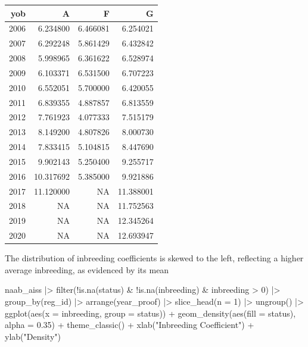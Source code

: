 \documentclass[
]{article}
\newenvironment{Shaded}{\begin{snugshade}}{\end{snugshade}}
\newcommand{\AttributeTok}[1]{\textcolor[rgb]{0.77,0.63,0.00}{#1}}
\newcommand{\DecValTok}[1]{\textcolor[rgb]{0.00,0.00,0.81}{#1}}
\newcommand{\FloatTok}[1]{\textcolor[rgb]{0.00,0.00,0.81}{#1}}
\newcommand{\FunctionTok}[1]{\textcolor[rgb]{0.00,0.00,0.00}{#1}}
\newcommand{\NormalTok}[1]{#1}
\newcommand{\SpecialCharTok}[1]{\textcolor[rgb]{0.00,0.00,0.00}{#1}}
\newcommand{\StringTok}[1]{\textcolor[rgb]{0.31,0.60,0.02}{#1}}
\begin{document}
\begin{longtable}[]{@{}rrrr@{}}
\toprule()
yob & A & F & G \\
\midrule()
\endhead
2006 & 6.234800 & 6.466081 & 6.254021 \\
2007 & 6.292248 & 5.861429 & 6.432842 \\
2008 & 5.998965 & 6.361622 & 6.528974 \\
2009 & 6.103371 & 6.531500 & 6.707223 \\
2010 & 6.552051 & 5.700000 & 6.420055 \\
2011 & 6.839355 & 4.887857 & 6.813559 \\
2012 & 7.761923 & 4.077333 & 7.515179 \\
2013 & 8.149200 & 4.807826 & 8.000730 \\
2014 & 7.833415 & 5.104815 & 8.447690 \\
2015 & 9.902143 & 5.250400 & 9.255717 \\
2016 & 10.317692 & 5.385000 & 9.921886 \\
2017 & 11.120000 & NA & 11.388001 \\
2018 & NA & NA & 11.752563 \\
2019 & NA & NA & 12.345264 \\
2020 & NA & NA & 12.693947 \\
\bottomrule()
\end{longtable}

The distribution of inbreeding coefficients is skewed to the left,
reflecting a higher average inbreeding, as evidenced by its mean

\begin{Shaded}
\begin{Highlighting}[]
\NormalTok{naab\_aiss }\SpecialCharTok{|\textgreater{}} 
  \FunctionTok{filter}\NormalTok{(}\SpecialCharTok{!}\FunctionTok{is.na}\NormalTok{(status) }\SpecialCharTok{\&} \SpecialCharTok{!}\FunctionTok{is.na}\NormalTok{(inbreeding) }\SpecialCharTok{\&}\NormalTok{ inbreeding }\SpecialCharTok{\textgreater{}} \DecValTok{0}\NormalTok{) }\SpecialCharTok{|\textgreater{}}
  \FunctionTok{group\_by}\NormalTok{(reg\_id) }\SpecialCharTok{|\textgreater{}}
  \FunctionTok{arrange}\NormalTok{(year\_proof) }\SpecialCharTok{|\textgreater{}}
  \FunctionTok{slice\_head}\NormalTok{(}\AttributeTok{n =} \DecValTok{1}\NormalTok{) }\SpecialCharTok{|\textgreater{}}
  \FunctionTok{ungroup}\NormalTok{() }\SpecialCharTok{|\textgreater{}}
  \FunctionTok{ggplot}\NormalTok{(}\FunctionTok{aes}\NormalTok{(}\AttributeTok{x =}\NormalTok{ inbreeding, }\AttributeTok{group =}\NormalTok{ status)) }\SpecialCharTok{+} 
  \FunctionTok{geom\_density}\NormalTok{(}\FunctionTok{aes}\NormalTok{(}\AttributeTok{fill =}\NormalTok{ status), }\AttributeTok{alpha =} \FloatTok{0.35}\NormalTok{) }\SpecialCharTok{+} 
  \FunctionTok{theme\_classic}\NormalTok{() }\SpecialCharTok{+} 
  \FunctionTok{xlab}\NormalTok{(}\StringTok{"Inbreeding Coefficient"}\NormalTok{) }\SpecialCharTok{+} \FunctionTok{ylab}\NormalTok{(}\StringTok{"Density"}\NormalTok{)}
\end{Highlighting}
\end{Shaded}
\end{document}
